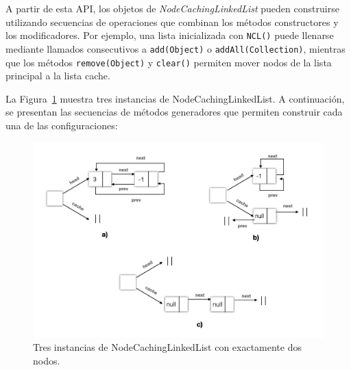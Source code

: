 \noindent
A partir de esta API, los objetos de \emph{NodeCachingLinkedList} pueden
construirse utilizando secuencias de operaciones que combinan los métodos
constructores y los modificadores. Por ejemplo, una lista inicializada con
\texttt{NCL()} puede llenarse mediante llamados consecutivos a
\texttt{add(Object)} o \texttt{addAll(Collection)}, mientras que los métodos
\texttt{remove(Object)} y \texttt{clear()} permiten mover nodos de la lista
principal a la lista cache.

La Figura~\ref{fig:ncl-instances-intro} muestra tres instancias de NodeCachingLinkedList. A continuación, se presentan las secuencias de métodos generadores que permiten construir cada una de las configuraciones:

\begin{figure}[H]
    \centering
    \includegraphics[width=1.0\textwidth]{images/ncl_instancias.png}
    \caption{Tres instancias de NodeCachingLinkedList con exactamente dos nodos.}
    \label{fig:ncl-instances-intro}
\end{figure}

